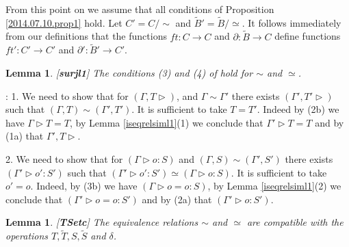 \documentclass[11pt]{article}
\newenvironment{proof}{{\bf Proof}:}{\vskip 5mm }
\newtheorem{lemma}[proposition]{Lemma}
\newcommand{\llabel}[1]{\label{#1}[{\bf #1}]}
\newcommand{\sr}{\rightarrow}
\newcommand{\wt}{\widetilde}
\begin{document}
%
From this point on we assume that all conditions of Proposition \ref{2014.07.10.prop1}  hold. Let $C'=C/\sim$ and $\wt{B}'=\wt{B}/\simeq$. It follows immediately from our definitions that the functions $ft:C\sr C$ and $\partial:\wt{B}\sr C$ define functions $ft':C'\sr C'$ and $\partial':\wt{B}'\sr C'$.
%
\begin{lemma}
\llabel{surjl1}
The conditions (3) and (4) of \cite[Proposition 5.4]{Csubsystems} hold for $\sim$ and $\simeq$.
\end{lemma}
%
\begin{proof}
1. We need to show that for $(\Gamma,T\rhd)$, and $\Gamma\sim\Gamma'$ there exists $(\Gamma',T'\rhd)$ such that $(\Gamma,T)\sim(\Gamma',T')$. It is sufficient to take $T=T'$. Indeed by (2b) we have $\Gamma\rhd T=T$, by Lemma \ref{iseqrelsiml1}(1) we conclude that $\Gamma'\rhd T=T$ and by (1a) that $\Gamma',T\rhd$.  

2.  We need to show that for $(\Gamma\rhd o:S)$ and $(\Gamma,S)\sim(\Gamma',S')$ there exists $(\Gamma'\rhd o':S')$ such that $(\Gamma'\rhd o':S')\simeq(\Gamma\rhd o:S)$. It is sufficient to take $o'=o$. Indeed, by (3b) we have $(\Gamma\rhd o=o:S)$, by Lemma \ref{iseqrelsiml1}(2) we conclude that $(\Gamma'\rhd o=o:S')$ and by (2a) that $(\Gamma'\rhd o:S')$. 
\end{proof}
%
\begin{lemma}
\llabel{TSetc}
The equivalence relations $\sim$ and $\simeq$ are compatible with the operations $T,\wt{T},S,\wt{S}$ and $\delta$.
\end{lemma}
%
\end{document}
